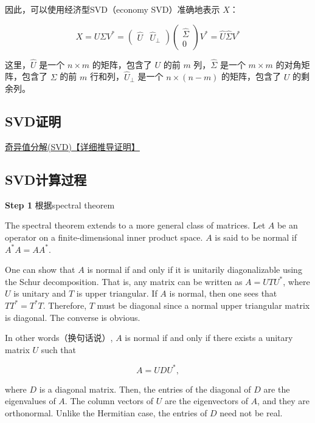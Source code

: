 \documentclass{ctexart}
\begin{document}
因此，可以使用经济型SVD（economy SVD）准确地表示 \( X \)：

\[ X = U \Sigma V^* = \begin{pmatrix}
\hat{U} & \hat{U}_\perp
\end{pmatrix} \begin{pmatrix}
\hat{\Sigma} \\
0
\end{pmatrix} V^* = \hat{U} \hat{\Sigma} V^* \]

这里，\( \hat{U} \) 是一个 \( n \times m \) 的矩阵，包含了 \( U \) 的前 \( m \) 列，\( \hat{\Sigma} \) 是一个 \( m \times m \) 的对角矩阵，包含了 \( \Sigma \) 的前 \( m \) 行和列，\( \hat{U}_\perp \) 是一个 \( n \times (n - m) \) 的矩阵，包含了 \( U \) 的剩余列。


\subsection{SVD证明}

\href{https://blog.csdn.net/v20000727/article/details/135682784}{奇异值分解(SVD)【详细推导证明】}



\subsection{SVD计算过程}

\textbf{Step 1}
根据spectral theorem

The spectral theorem extends to a more general class of matrices. Let \( A \) be an operator on a finite-dimensional inner product space. \( A \) is said to be normal if \( A^* A = A A^* \).

One can show that \( A \) is normal if and only if it is unitarily diagonalizable using the Schur decomposition. That is, any matrix can be written as \( A = U T U^* \), where \( U \) is unitary and \( T \) is upper triangular. If \( A \) is normal, then one sees that \( T T^* = T^* T \). Therefore, \( T \) must be diagonal since a normal upper triangular matrix is diagonal. The converse is obvious.

In other words（换句话说）, \( A \) is normal if and only if there exists a unitary matrix \( U \) such that

\[ A = U D U^*, \]

where \( D \) is a diagonal matrix. Then, the entries of the diagonal of \( D \) are the eigenvalues of \( A \). The column vectors of \( U \) are the eigenvectors of \( A \), and they are orthonormal. Unlike the Hermitian case, the entries of \( D \) need not be real.
\end{document}
